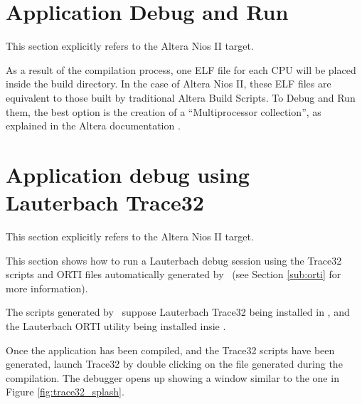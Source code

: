 \section{Application Debug and Run}
 
This section explicitly refers to the Altera Nios II target.

As a result of the compilation process, one ELF file for each CPU will
be placed inside the build directory. In the case of Altera Nios II,
these ELF files are equivalent to those built by traditional Altera
Build Scripts. To Debug and Run them, the best option is the creation
of a ``Multiprocessor collection'', as explained in the Altera
documentation \cite{Altera-multicpu-tutorial}.



\section{Application debug using Lauterbach Trace32}
\label{sec:trace32}

This section explicitly refers to the Altera Nios II target.

This section shows how to run a Lauterbach debug session using the
Trace32 scripts and ORTI files automatically generated by \rtd\ (see
Section \ref{sub:orti} for more information).

\begin{warning}
The scripts generated by \rtd\ suppose Lauterbach Trace32 being
installed in , and the Lauterbach ORTI utility
 being installed insie
.
\end{warning}

Once the application has been compiled, and the Trace32 scripts have
been generated, launch Trace32 by double clicking on the
 file generated during the compilation. The
debugger opens up showing a window similar to the one in Figure
\ref{fig:trace32_splash}.

